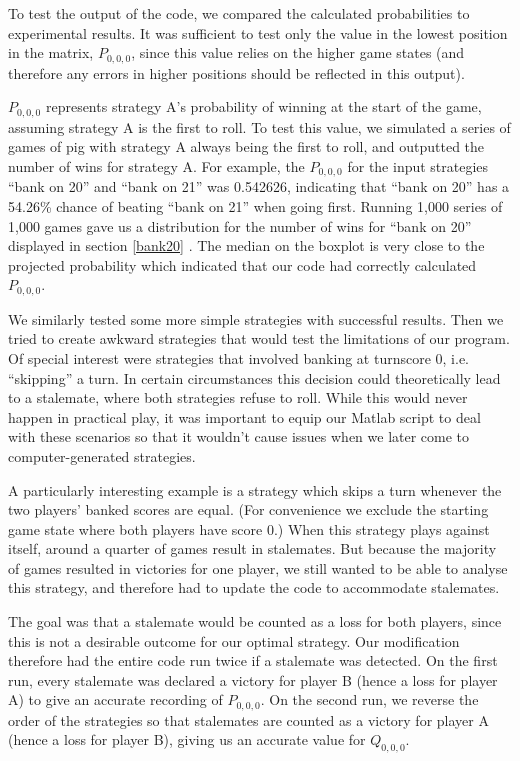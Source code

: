 \documentclass[a4paper,titlepage]{article}
\begin{document}

To test the output of the code, we compared the calculated probabilities to experimental results. It was sufficient to test only the value in the lowest position in the matrix, $P_{0,0,0}$, since this value relies on the higher game states (and therefore any errors in higher positions should be reflected in this output).

$P_{0,0,0}$ represents strategy A's probability of winning at the start of the game, assuming strategy A is the first to roll. To test this value, we simulated a series of games of pig with strategy A always being the first to roll, and outputted the number of wins for strategy A. For example, the $P_{0,0,0}$ for the input strategies ``bank on 20'' and ``bank on 21'' was 0.542626, indicating that ``bank on 20'' has a 54.26\% chance of beating ``bank on 21'' when going first. Running 1,000 series of 1,000 games gave us a distribution for the number of wins for ``bank on 20'' displayed in section \ref{bank20}
. The median on the boxplot is very close to the projected probability which indicated that our code had correctly calculated $P_{0,0,0}$.

We similarly tested some more simple strategies with successful results. Then we tried to create awkward strategies that would test the limitations of our program. Of special interest were strategies that involved banking at turnscore 0, i.e. ``skipping'' a turn. In certain circumstances this decision could theoretically lead to a stalemate, where both strategies refuse to roll. While this would never happen in practical play, it was important to equip our Matlab script to deal with these scenarios so that it wouldn't cause issues when we later come to computer-generated strategies.

A particularly interesting example is a strategy which skips a turn whenever the two players' banked scores are equal. (For convenience we exclude the starting game state where both players have score 0.) When this strategy plays against itself, around a quarter of games result in stalemates. But because the majority of games resulted in victories for one player, we still wanted to be able to analyse this strategy, and therefore had to update the code to accommodate stalemates.

The goal was that a stalemate would be counted as a loss for both players, since this is not a desirable outcome for our optimal strategy. Our modification therefore had the entire code run twice if a stalemate was detected. On the first run, every stalemate was declared a victory for player B (hence a loss for player A) to give an accurate recording of $P_{0,0,0}$. On the second run, we reverse the order of the strategies so that stalemates are counted as a victory for player A (hence a loss for player B), giving us an accurate value for $Q_{0,0,0}$.
\end{document}
